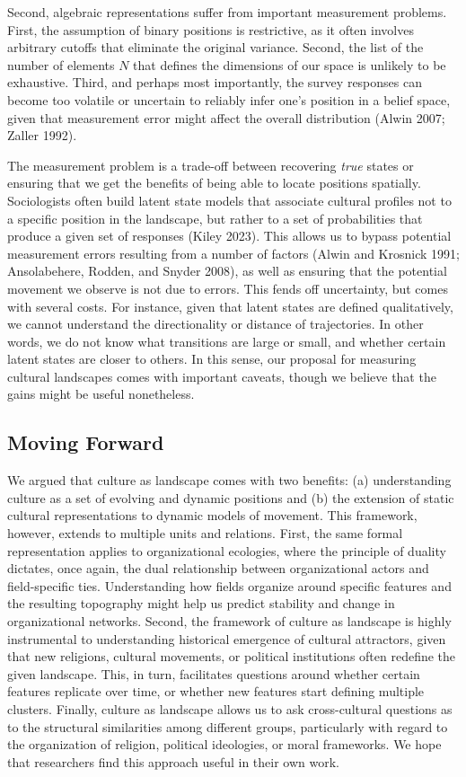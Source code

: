 \documentclass[
  11pt,
]{article}
\begin{document}
Second, algebraic representations suffer from important measurement
problems. First, the assumption of binary positions is restrictive, as
it often involves arbitrary cutoffs that eliminate the original
variance. Second, the list of the number of elements \(N\) that defines
the dimensions of our space is unlikely to be exhaustive. Third, and
perhaps most importantly, the survey responses can become too volatile
or uncertain to reliably infer one's position in a belief space, given
that measurement error might affect the overall distribution (Alwin
2007; Zaller 1992).

The measurement problem is a trade-off between recovering \emph{true}
states or ensuring that we get the benefits of being able to locate
positions spatially. Sociologists often build latent state models that
associate cultural profiles not to a specific position in the landscape,
but rather to a set of probabilities that produce a given set of
responses (Kiley 2023). This allows us to bypass potential measurement
errors resulting from a number of factors (Alwin and Krosnick 1991;
Ansolabehere, Rodden, and Snyder 2008), as well as ensuring that the
potential movement we observe is not due to errors. This fends off
uncertainty, but comes with several costs. For instance, given that
latent states are defined qualitatively, we cannot understand the
directionality or distance of trajectories. In other words, we do not
know what transitions are large or small, and whether certain latent
states are closer to others. In this sense, our proposal for measuring
cultural landscapes comes with important caveats, though we believe that
the gains might be useful nonetheless.

\hypertarget{moving-forward}{%
\subsection{Moving Forward}\label{moving-forward}}

We argued that culture as landscape comes with two benefits: (a)
understanding culture as a set of evolving and dynamic positions and (b)
the extension of static cultural representations to dynamic models of
movement. This framework, however, extends to multiple units and
relations. First, the same formal representation applies to
organizational ecologies, where the principle of duality dictates, once
again, the dual relationship between organizational actors and
field-specific ties. Understanding how fields organize around specific
features and the resulting topography might help us predict stability
and change in organizational networks. Second, the framework of culture
as landscape is highly instrumental to understanding historical
emergence of cultural attractors, given that new religions, cultural
movements, or political institutions often redefine the given landscape.
This, in turn, facilitates questions around whether certain features
replicate over time, or whether new features start defining multiple
clusters. Finally, culture as landscape allows us to ask cross-cultural
questions as to the structural similarities among different groups,
particularly with regard to the organization of religion, political
ideologies, or moral frameworks. We hope that researchers find this
approach useful in their own work.
\end{document}
